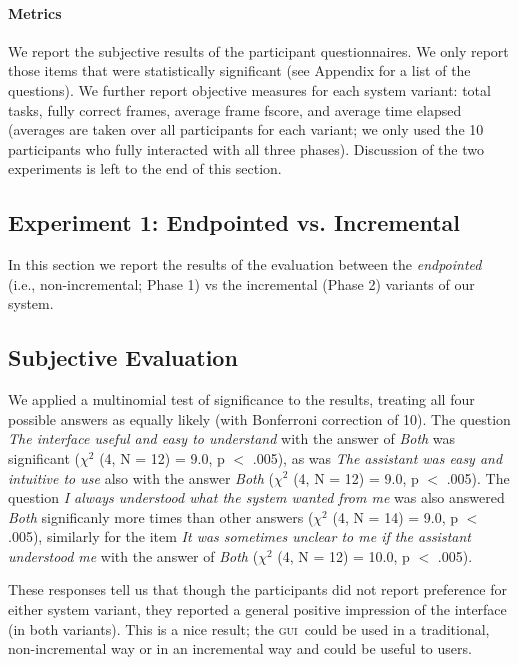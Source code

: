 \documentclass[11pt]{article}
\newcommand{\ui}[0]{\textsc{gui}}
\begin{document}
\paragraph{Metrics} We report the subjective results of the participant questionnaires. We only report those items that were statistically significant (see Appendix for a list of the questions). We further report objective measures for each system variant: total tasks, fully correct frames, average frame fscore, and average time elapsed (averages are taken over all participants for each variant; we only used the 10 participants who fully interacted with all three phases). Discussion of the two experiments is left to the end of this section.

\subsection{Experiment 1: Endpointed vs. Incremental}
\label{section:exp1}

In this section we report the results of the evaluation between the \emph{endpointed} (i.e., non-incremental; Phase 1) vs the incremental (Phase 2) variants of our system.

\subsection{Subjective Evaluation} We applied a multinomial test of significance to the results, treating all four possible answers as equally likely (with Bonferroni correction of 10). The question \emph{The interface useful and easy to understand} with the answer of \emph{Both} was significant ($ \chi^2 $ (4, N = 12) = 9.0, p $<$ .005), as was \emph{The assistant was easy and intuitive to use} also with the answer \emph{Both} ($ \chi^2 $ (4, N = 12) = 9.0, p $<$ .005). The question \emph{I always understood what the system wanted from me} was also answered \emph{Both} significanly more times than other answers ($ \chi^2 $ (4, N = 14) = 9.0, p $<$ .005), similarly for the item \emph{It was sometimes unclear to me if the assistant understood me} with the answer of \emph{Both} ($ \chi^2 $ (4, N = 12) = 10.0, p $<$ .005). 

These responses tell us that though the participants did not report preference for either system variant, they reported a general positive impression of the interface (in both variants). This is a nice result; the \ui\ could be used in a traditional, non-incremental way or in an incremental way and could be useful to users. 
\end{document}
